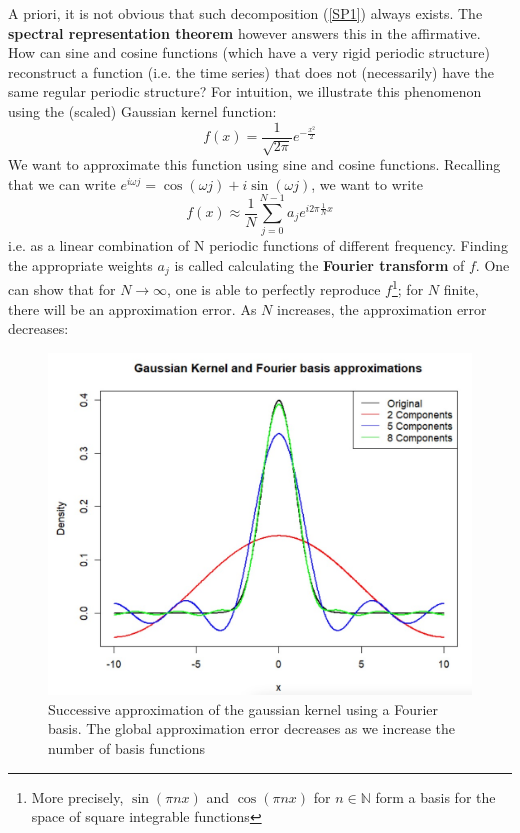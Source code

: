 A priori, it is not obvious that such decomposition (\ref{SP1}) always exists. The \textbf{spectral representation theorem} however answers this in the affirmative. How can sine and cosine functions (which have a very rigid periodic structure) reconstruct a function (i.e. the time series) that does not (necessarily) have the same regular periodic structure? For intuition, we illustrate this phenomenon using the (scaled) Gaussian kernel function: \[f(x)=\frac{1}{\sqrt{2\pi}}e^{-\frac{x^2}{2}} \]
We want to approximate this function using sine and cosine functions. Recalling that we can write $e^{i\omega j} = \cos(\omega j) + i \sin(\omega j)$, we want to write \[f(x) \approx \frac{1}{N} \sum_{j=0}^{N-1}a_j e^{i2\pi\frac{1}{N} x} \] i.e. as a linear combination of N periodic functions of different frequency. Finding the appropriate weights $a_j$ is called calculating the \textbf{Fourier transform} of $f$. One can show that for $N\rightarrow\infty$, one is able to perfectly reproduce $f$\footnote{More precisely, $\sin(\pi n x)$ and $\cos(\pi nx)$ for $n \in \mathbb{N}$ form a basis for the space of square integrable functions}; for $N$ finite, there will be an approximation error. As $N$ increases, the approximation error decreases: 

\begin{figure}[h]
\includegraphics[scale=0.3]{images/Screenshot 2024-05-06 at 09.35.47.jpg}
\centering
\caption{Successive approximation of the gaussian kernel using a Fourier basis. The global approximation error decreases as we increase the number of basis functions}
\end{figure}

